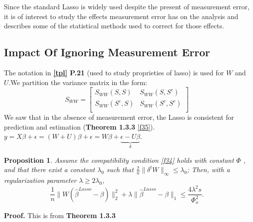 \documentclass[12pt]{report}
\newtheorem {proposition}{Proposition}[section]  %
\begin{document}
Since the standard Lasso is widely used despite the present of measurement error, it is of interest to study the effects measurement error has on the analysis and describes some of the statistical methods used to correct for those effects.
\subsection{Impact Of Ignoring Measurement Error}
The notation in \textbf{\ref{tpl} P.21} (used to study proprieties of lasso) is used for $W$ and $U$.We partition the variance matrix in the form:
\begin{equation}
S_{WW}=\begin{bmatrix}
	S_{WW}(S,S)& S_{WW}(S,S^{c}) \\
	 S_{WW}(S^{c},S) & S_{WW}(S^{c},S^{c}) \\
\end{bmatrix}
\end{equation}
We saw that in the absence of measurement error, the Lasso is consistent for prediction and estimation (\textbf{Theorem 1.3.3} \eqref{f35}).
$y=X\beta +\epsilon=(W+U)\beta+\epsilon=W\beta+ \underbrace{\epsilon-U\beta}_{\delta}$.
\begin{proposition}
	Assume the compatibility condition  \eqref{f34} holds with constant $\Phi$ , and that there exist a constant $\lambda_{0}$ such that  $\frac{2}{n}\parallel\delta^{t}W\parallel_{\infty}\leq \lambda_{0}$; Then, with a regularization parameter $\lambda \geq 2\lambda_{0}$,
	\begin{equation}
		\frac{1}{n}\parallel W(\hat{\beta}^{Lasso}-\beta )\parallel^{2}_{2}+  \lambda\parallel \hat{\beta}^{Lasso}-\beta \parallel_{1}\leq \frac{4 \lambda^{2}s}{\Phi_{o}^{2}}.
		\label{f61}
	\end{equation}
\end{proposition}
\textbf{Proof.} This is from \textbf{Theorem 1.3.3}\\
\end{document}
